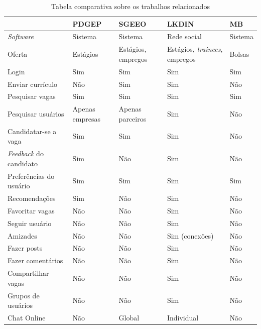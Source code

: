 \documentclass[cic,tc]{iiufrgs}
\begin{document}
\begin{table}[h]
    \begin{adjustwidth}{-0.7in}{-0.7in}
    \begin{center}
    \caption{Tabela comparativa sobre os trabalhos relacionados}
    \begin{tabular}{lllll}
    \hline
                        & PDGEP           & SGEEO             & LKDIN         & MB \\
    \hline
    \textit{Software}   & Sistema         & Sistema           & Rede social   & Sistema \\
    Oferta              & Estágios        & Estágios, empregos &Estágios, \textit{trainees}, empregos & Bolsas \\
    Login               & Sim             & Sim               & Sim           & Sim \\
    Enviar currículo    & Não             & Sim               & Sim           & Não \\
    Pesquisar vagas     & Sim             & Sim               & Sim           & Sim \\
    Pesquisar usuários  & Apenas empresas & Apenas parceiros  & Sim           & Não \\
    Candidatar-se a vaga& Sim             & Sim               & Sim           & Não \\
    \textit{Feedback} do candidato & Sim  & Não               & Sim           & Não \\
    Preferências do usuário & Sim         & Sim               & Sim           & Sim \\
    Recomendações       & Sim             & Não               & Sim           & Não \\
    Favoritar vagas     & Não             & Não               & Sim           & Não \\
    Seguir usuário      & Não             & Não               & Sim           & Não \\
    Amizades            & Não             & Não               & Sim (conexões) & Não \\
    Fazer posts         & Não             & Não               & Sim           & Não \\
    Fazer comentários   & Não             & Não               & Sim           & Não \\
    Compartilhar vagas  & Não             & Não               & Sim           & Não \\
    Grupos de usuários  & Não             & Não               & Sim           & Não \\
    Chat Online         & Não             & Global            & Individual    & Não \\
    \hline
    
    \end{tabular}
    \end{center}
    \end{adjustwidth}
    \bigskip
    \label{tabelaAvalTrab}
\end{table}
\end{document}
